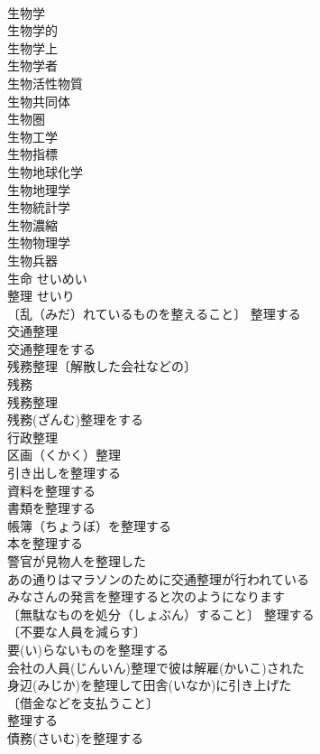\documentclass[8pt]{extreport}
\begin{document}
\begin{CJK}{UTF8}{min}
\\	生物学 
\\	生物学的 
\\	生物学上 
\\	生物学者 
\\	生物活性物質 
\\	生物共同体 
\\	生物圏 
\\	生物工学 
\\	生物指標 
\\	生物地球化学 
\\	生物地理学 
\\	生物統計学 
\\	生物濃縮 
\\	生物物理学 
\\	生物兵器 
\\	生命	せいめい	
\\	整理	せいり	
\\	〔乱（みだ）れているものを整えること〕 整理する 
\\	交通整理 
\\	交通整理をする 
\\	残務整理〔解散した会社などの〕 
\\	残務　
\\	残務整理　
\\	残務(ざんむ)整理をする 
\\	行政整理 
\\	区画（くかく）整理 
\\	引き出しを整理する 
\\	資料を整理する 
\\	書類を整理する 
\\	帳簿（ちょうぼ）を整理する 
\\	本を整理する 
\\	警官が見物人を整理した 
\\	あの通りはマラソンのために交通整理が行われている 
\\	みなさんの発言を整理すると次のようになります 
\\	〔無駄なものを処分（しょぶん）すること〕 整理する 
\\	〔不要な人員を減らす〕
\\	要(い)らないものを整理する 
\\	会社の人員(じんいん)整理で彼は解雇(かいこ)された 
\\	身辺(みじか)を整理して田舎(いなか)に引き上げた 
\\	〔借金などを支払うこと〕
\\	整理する 
\\	債務(さいむ)を整理する 

\end{CJK}
\end{document}
